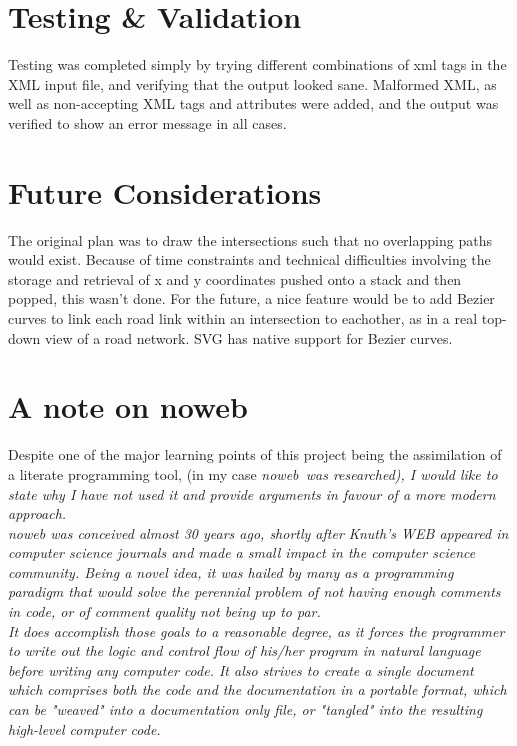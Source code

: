\documentclass{article}
\begin{document}
\section{Testing \& Validation}

Testing was completed simply by trying different combinations of xml tags in the XML input file, and verifying that the output looked sane. Malformed XML, as well as non-accepting XML tags and attributes were added, and the output was verified to show an error message in all cases. 

\section{Future Considerations}

The original plan was to draw the intersections such that no overlapping paths would exist. Because of time constraints and technical difficulties involving the storage and retrieval of x and y coordinates pushed onto a stack and then popped, this wasn't done. For the future, a nice feature would be to add Bezier curves to link each road link within an intersection to eachother, as in a real top-down view of a road network. SVG has native support for Bezier curves.

\section{A note on noweb}

Despite one of the major learning points of this project being the assimilation of a literate programming tool, (in my case \em noweb\em\ was researched), I would like to state why I have not used it and provide arguments in favour of a more modern approach.\\

noweb was conceived almost 30 years ago, shortly after Knuth's WEB appeared in computer science journals and made a small impact in the computer science community. Being a novel idea, it was hailed by many as a programming paradigm that would solve the perennial problem of not having enough comments in code, or of comment quality not being up to par.\\

It does accomplish those goals to a reasonable degree, as it forces the programmer to write out the logic and control flow of his/her program in natural language before writing any computer code. It also strives to create a single document which comprises both the code and the documentation in a portable format, which can be "weaved" into a documentation only file, or "tangled" into the resulting high-level computer code.\\
\end{document}
